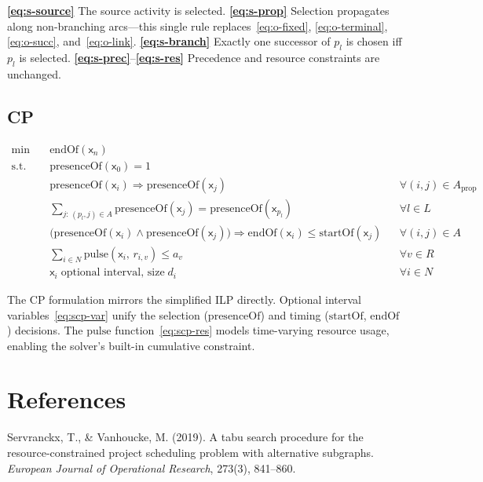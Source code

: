 \documentclass{article}
\begin{document}
\noindent
\textbf{\eqref{eq:s-source}} The source activity is selected.
\textbf{\eqref{eq:s-prop}} Selection propagates along non-branching arcs---this single rule replaces~\eqref{eq:o-fixed}, \eqref{eq:o-terminal}, \eqref{eq:o-succ}, and~\eqref{eq:o-link}.
\textbf{\eqref{eq:s-branch}} Exactly one successor of $p_l$ is chosen iff $p_l$ is selected.
\textbf{\eqref{eq:s-prec}}--\textbf{\eqref{eq:s-res}} Precedence and resource constraints are unchanged.


\subsection{CP}

\begin{align}
\min \quad & \mathrm{endOf}(\mathsf{x}_n) \label{eq:scp-obj} \\[2mm]
\text{s.t.} \quad
& \mathrm{presenceOf}(\mathsf{x}_0) = 1
    \label{eq:scp-source} \\
& \mathrm{presenceOf}(\mathsf{x}_i) \Rightarrow \mathrm{presenceOf}(\mathsf{x}_j)
    && \forall (i,j) \in A_{\mathrm{prop}} \label{eq:scp-prop} \\
& \sum_{j:\,(p_l,j) \in A} \mathrm{presenceOf}(\mathsf{x}_j) = \mathrm{presenceOf}(\mathsf{x}_{p_l})
    && \forall l \in L \label{eq:scp-branch} \\
& \bigl(\mathrm{presenceOf}(\mathsf{x}_i) \!\wedge\! \mathrm{presenceOf}(\mathsf{x}_j)\bigr) \Rightarrow \mathrm{endOf}(\mathsf{x}_i) \le \mathrm{startOf}(\mathsf{x}_j)
    && \forall (i,j) \!\in\! A \label{eq:scp-prec} \\
& \sum_{i \in N} \mathrm{pulse}(\mathsf{x}_i,\, r_{i,v}) \le a_v
    && \forall v \in R \label{eq:scp-res} \\
& \mathsf{x}_i \;\text{optional interval, size}\; d_i
    && \forall i \in N \label{eq:scp-var}
\end{align}

\noindent
The CP formulation mirrors the simplified ILP directly. Optional interval variables~\eqref{eq:scp-var} unify the selection ($\mathrm{presenceOf}$) and timing ($\mathrm{startOf}$, $\mathrm{endOf}$) decisions. The $\mathrm{pulse}$ function~\eqref{eq:scp-res} models time-varying resource usage, enabling the solver's built-in cumulative constraint.


\section{References}

\noindent
Servranckx, T., \& Vanhoucke, M. (2019). A tabu search procedure for the resource-constrained project scheduling problem with alternative subgraphs. \textit{European Journal of Operational Research}, 273(3), 841--860.
\end{document}
